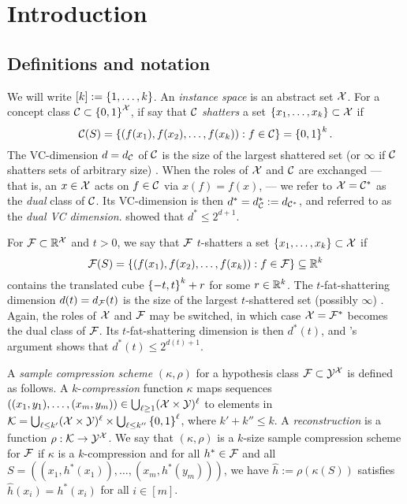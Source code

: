
\chapter{Introduction}
    
\blindtext
    
    
    

\section{Definitions and notation}
\label{sec:defnot}

We will write
$[k]:=\left\{ 1,\ldots,k \right\}$.
An {\em instance space} is an abstract set $\mathcal{X}$.
For a concept class $\mathcal{C}\subset\left\{ 0,1 \right\}^{\mathcal{X}}$,
if say that $\mathcal{C}$ {\em shatters} a set $\left\{ x_1,\ldots,x_k \right\}\subset\mathcal{X}$
if
$$\mathcal{C}(S) = \left\{  (f(x_1),f(x_2),\ldots,f(x_k)) : f\in\mathcal{C} \right\}
=
\left\{ 0,1 \right\}^k
.
$$
The VC-dimension $d=d_{\mathcal{C}}$ of $\mathcal{C}$ is the size of the largest shattered set (or $\infty$ if $\mathcal{C}$ shatters
sets of arbitrary size) \citep{MR0288823}.
When the roles of $\mathcal{X}$ and $\mathcal{C}$ are exchanged ---
that is, an $x\in\mathcal{X}$ acts on $f\in\mathcal{C}$
via
$x(f)=f(x)$, ---
we refer to $\mathcal{X}=\mathcal{C}^*$ as the {\em dual} class of $\mathcal{C}$.
Its VC-dimension is then $d^*=d^*_{\mathcal{C}}:=d_{\mathcal{C}^*}$, 
and referred to as the \emph{dual VC dimension}.
\citet{MR723955} showed that $d^*\le2^{d+1}$.

For $\mathcal{F}\subset\mathbb{R}^{\mathcal{X}}$ and $t>0$,
we say that $\mathcal{F}$ $t$-shatters
a set $\left\{ x_1,\ldots,x_k \right\}\subset\mathcal{X}$
if
$$\mathcal{F}(S) = \left\{  (f(x_1),f(x_2),\ldots,f(x_k)) : f\in\mathcal{F} \right\}\subseteq\mathbb{R}^k$$
contains the translated cube $\left\{ -t,t \right\}^k+r$ for some $r\in\mathbb{R}^k$.
The $t$-fat-shattering dimension $d(t)=d_{\mathcal{F}}(t)$
is the size of the largest $t$-shattered set (possibly $\infty$) \citep{alon97scalesensitive}.
Again, the roles of $\mathcal{X}$ and $\mathcal{F}$ may be switched,
in which case $\mathcal{X}=\mathcal{F}^*$ becomes the dual class of $\mathcal{F}$.
Its $t$-fat-shattering dimension is then $d^*(t)$,
and \citeauthor{MR723955}'s argument shows that $d^*(t) \leq 2^{d(t)+1}$.

A {\em sample compression scheme} $(\kappa,\rho)$ for a hypothesis
class $\mathcal{F}\subset\mathcal{Y}^{\mathcal{X}}$
is defined as follows.
A $k$-{\em compression} function $\kappa$
maps sequences $((x_1,y_1),\ldots,(x_m,y_m))\in\bigcup_{\ell\ge1}(\mathcal{X}\times\mathcal{Y})^\ell$
to elements in
$\mathcal{K}=\bigcup_{\ell\le k'}(\mathcal{X}\times\mathcal{Y})^\ell
\times
\bigcup_{\ell\le k''}\left\{ 0,1 \right\}^\ell$,
where $k'+k''\le k$.
A {\em reconstruction} is a function $\rho:\mathcal{K}\to\mathcal{Y}^{\mathcal{X}}$.
We say that $(\kappa,\rho)$ is a $k$-size sample compression
scheme for $\mathcal{F}$
if
$\kappa$ is a $k$-compression and
for all
$h^*\in\mathcal{F}$
and all
$S=((x_1,h^{*}(x_1)),\ldots,(x_m,h^{*}(y_m)))$,
we have
$\hat h:=\rho(\kappa(S))$
satisfies $\hat h(x_i)=h^*(x_i)$ for all $i\in[m]$.

